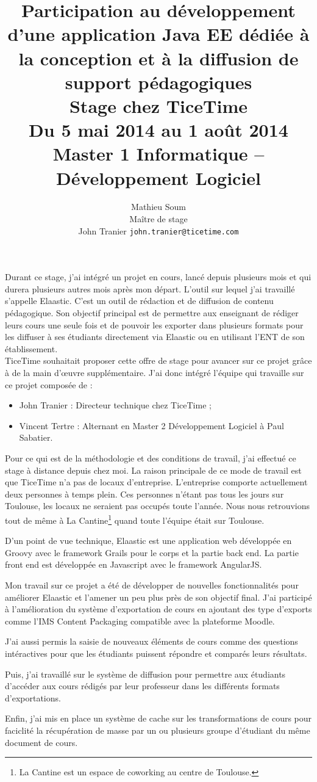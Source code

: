 \documentclass[a4paper, 11pt]{article}
\title{
  Participation au développement d'une application Java EE dédiée à la
  conception et à la diffusion de support pédagogiques\\
  \vspace{10px}
  {
	\large Stage chez TiceTime\\
	Du 5 mai 2014 au 1 août 2014\\
	Master 1 Informatique -- Développement Logiciel
  }
}
\author{
  Mathieu {\sc Soum}
  \vspace{10px}\\
  Maître de stage\\
	John {\sc Tranier} {\tt john.tranier@ticetime.com}
}
\date{}
\begin{document}
\maketitle

Durant ce stage, j'ai intégré un projet en cours, lancé depuis plusieurs mois et
qui durera plusieurs autres mois après mon départ. L'outil sur lequel j'ai
travaillé s'appelle Elaastic. C'est un outil de rédaction et de diffusion de
contenu pédagogique. Son objectif principal est de permettre aux enseignant de
rédiger leurs cours une seule fois et de pouvoir les exporter dans plusieurs
formats pour les diffuser à ses étudiants directement via Elaastic ou en
utilisant l'ENT de son établissement.\\

TiceTime souhaitait proposer cette offre de stage pour avancer sur ce projet
grâce à de la main d'\oe uvre supplémentaire.
J'ai donc intégré l'équipe qui travaille sur ce projet composée de :
\begin{itemize}
  \item John {\sc Tranier} : Directeur technique chez TiceTime ;
  \item Vincent {\sc Tertre} : Alternant en Master 2 Développement Logiciel à Paul
	Sabatier.
\end{itemize}
\vspace{10px}

Pour ce qui est de la méthodologie et des conditions de travail, j'ai effectué
ce stage à distance depuis chez moi. La raison principale de ce mode de travail
est que TiceTime n'a pas de locaux d'entreprise. L'entreprise comporte
actuellement deux personnes à temps plein. Ces personnes n'étant pas tous les
jours sur Toulouse, les locaux ne seraient pas occupés toute l'année. Nous nous
retrouvions tout de même à La Cantine\footnote{La Cantine est un espace de
coworking au centre de Toulouse.} quand toute l'équipe était sur Toulouse.

D'un point de vue technique, Elaastic est une application web développée en
Groovy avec le framework Grails pour le corps et la partie back end. La partie
front end est développée en Javascript avec le framework AngularJS.

Mon travail sur ce projet a été de développer de nouvelles fonctionnalités pour
améliorer Elaastic et l'amener un peu plus près de son objectif final. J'ai
participé à l'amélioration du système d'exportation de cours en ajoutant des
type d'exports comme l'IMS Content Packaging compatible avec la plateforme
Moodle.

J'ai aussi permis la saisie de nouveaux éléments de cours comme des
questions intéractives pour que les étudiants puissent répondre et comparés
leurs résultats.

Puis, j'ai travaillé sur le système de diffusion pour
permettre aux étudiants d'accéder aux cours rédigés par leur professeur dans les
différents formats d'exportations.

Enfin, j'ai mis en place un système de cache
sur les transformations de cours pour faciclité la récupération de masse par un
ou plusieurs groupe d'étudiant du même document de cours.
\end{document}
